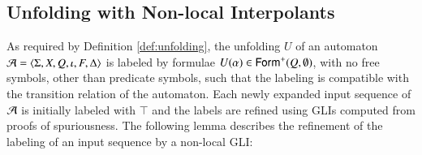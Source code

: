 \subsection{Unfolding with Non-local Interpolants}

As required by Definition \ref{def:unfolding}, the unfolding $U$ of an
automaton $\mathcal{A} = \langle \Sigma,X,Q,\iota,F,\Delta \rangle$ is labeled by
formulae $U(\alpha) \in \mathsf{Form}^+(Q,\emptyset)$, with no free symbols,
other than predicate symbols, such that the labeling is compatible
with the transition relation of the automaton. Each newly expanded
input sequence of $\mathcal{A}$ is initially labeled with $\top$ and the labels
are refined using GLIs computed from proofs of spuriousness. The
following lemma describes the refinement of the labeling of an input
sequence by a non-local GLI:

